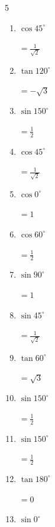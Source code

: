\begin{multicols}{5}
\begin{enumerate}
        $\displaystyle =-\sqrt{3}$

  \item $\displaystyle \cos{45^\circ}$

        $\displaystyle =\frac{1}{\sqrt{2}}$

  \item $\displaystyle \tan{120^\circ}$

        $\displaystyle =-\sqrt{3}$

  \item $\displaystyle \sin{150^\circ}$

        $\displaystyle =\frac{1}{2}$

  \item $\displaystyle \cos{45^\circ}$

        $\displaystyle =\frac{1}{\sqrt{2}}$

  \item $\displaystyle \cos{0^\circ}$

        $\displaystyle =1$

  \item $\displaystyle \cos{60^\circ}$

        $\displaystyle =\frac{1}{2}$

  \item $\displaystyle \sin{90^\circ}$

        $\displaystyle =1$

\columnbreak %

  \item $\displaystyle \sin{45^\circ}$

        $\displaystyle =\frac{1}{\sqrt{2}}$

  \item $\displaystyle \tan{60^\circ}$

        $\displaystyle =\sqrt{3}$

  \item $\displaystyle \sin{150^\circ}$

        $\displaystyle =\frac{1}{2}$

  \item $\displaystyle \sin{150^\circ}$

        $\displaystyle =\frac{1}{2}$

  \item $\displaystyle \tan{180^\circ}$

        $\displaystyle =0$

  \item $\displaystyle \sin{0^\circ}$


\end{enumerate}
\end{multicols}
